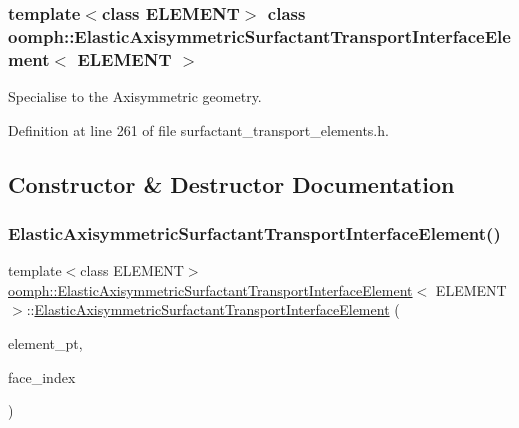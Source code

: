 \subsubsection*{template$<$class E\+L\+E\+M\+E\+NT$>$\newline
class oomph\+::\+Elastic\+Axisymmetric\+Surfactant\+Transport\+Interface\+Element$<$ E\+L\+E\+M\+E\+N\+T $>$}

Specialise to the Axisymmetric geometry. 

Definition at line 261 of file surfactant\+\_\+transport\+\_\+elements.\+h.



\subsection{Constructor \& Destructor Documentation}
\mbox{\label{classoomph_1_1ElasticAxisymmetricSurfactantTransportInterfaceElement_a7e0f4dbf25bf0556a2675e599eeb6365}} 
\subsubsection{\texorpdfstring{Elastic\+Axisymmetric\+Surfactant\+Transport\+Interface\+Element()}{ElasticAxisymmetricSurfactantTransportInterfaceElement()}}
{\footnotesize\ttfamily template$<$class E\+L\+E\+M\+E\+NT$>$ \\
\hyperlink{classoomph_1_1ElasticAxisymmetricSurfactantTransportInterfaceElement}{oomph\+::\+Elastic\+Axisymmetric\+Surfactant\+Transport\+Interface\+Element}$<$ E\+L\+E\+M\+E\+NT $>$\+::\hyperlink{classoomph_1_1ElasticAxisymmetricSurfactantTransportInterfaceElement}{Elastic\+Axisymmetric\+Surfactant\+Transport\+Interface\+Element} (\begin{DoxyParamCaption}\item[{Finite\+Element $\ast$const \&}]{element\+\_\+pt,  }\item[{const int \&}]{face\+\_\+index }\end{DoxyParamCaption})\hspace{0.3cm}{\ttfamily [inline]}}



